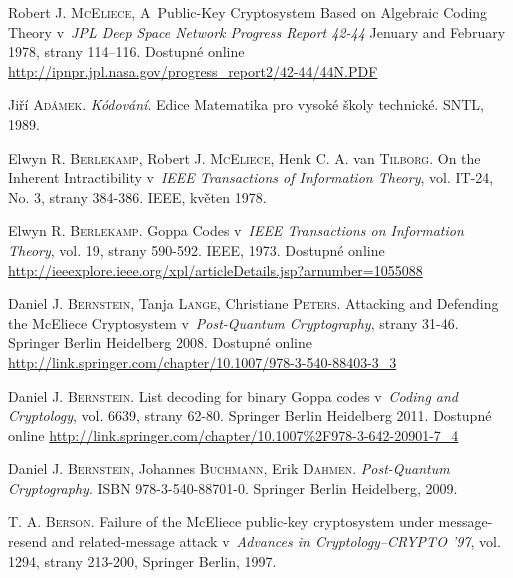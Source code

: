 \documentclass[thesis=M,czech,hidelinks]{FITthesis}[2012/06/26]
\newcommand{\0}{{\textcolor[gray]{0.80}{0}}}
\begin{document}
%
%
\begin{thebibliography}{99}

        Robert J. \textsc{McEliece}, A~Public-Key Cryptosystem Based on
        Algebraic Coding Theory v~\emph{JPL Deep Space Network Progress Report
        42-44} Jenuary and February 1978, strany 114–116. Dostupné online
        \url{http://ipnpr.jpl.nasa.gov/progress_report2/42-44/44N.PDF}

        Jiří \textsc{Adámek}. \emph{Kódování}. Edice Matematika pro vysoké školy
        technické. SNTL, 1989.

        Elwyn R. \textsc{Berlekamp}, Robert J. \textsc{McEliece}, Henk C. A. van
        \textsc{Tilborg}.  On the Inherent Intractibility v~\emph{IEEE
        Transactions of Information Theory}, vol. IT-24, No. 3, strany 384-386.
        IEEE, květen 1978.

        Elwyn R. \textsc{Berlekamp}. Goppa Codes v~\emph{IEEE Transactions on
        Information Theory}, vol. 19, strany 590-592. IEEE, 1973. Dostupné
        online
        \url{http://ieeexplore.ieee.org/xpl/articleDetails.jsp?arnumber=1055088}

        Daniel J. \textsc{Bernstein}, Tanja \textsc{Lange}, Christiane
        \textsc{Peters}. Attacking and Defending the McEliece Cryptosystem
        v~\emph{Post-Quantum Cryptography}, strany 31-46. Springer Berlin
        Heidelberg 2008. Dostupné online
        \url{http://link.springer.com/chapter/10.1007/978-3-540-88403-3\_3}

        Daniel J. \textsc{Bernstein}. List decoding for binary Goppa codes
        v~\emph{Coding and Cryptology}, vol. 6639, strany 62-80. Springer Berlin
        Heidelberg 2011. Dostupné online
        \url{http://link.springer.com/chapter/10.1007\%2F978-3-642-20901-7\_4}

        Daniel J. \textsc{Bernstein}, Johannes \textsc{Buchmann}, Erik
        \textsc{Dahmen}. \emph{Post-Quantum Cryptography}. ISBN
        978-3-540-88701-0.  Springer Berlin Heidelberg, 2009.

        T. A. \textsc{Berson}. Failure of the McEliece public-key cryptosystem under
        message-resend and related-message attack v~\emph{Advances in
        Cryptology–CRYPTO ’97}, vol. 1294, strany 213-200, Springer Berlin, 1997.


\end{thebibliography}
\end{document}
